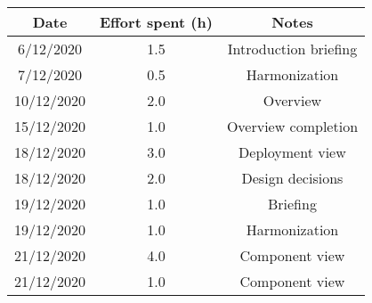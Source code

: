 \documentclass[../../main.tex]{subfiles}
\begin{document}
    \begin{center}
        \begin{tabular}{|c| |c| |c|} 
            \hline
            Date & Effort spent (h) & Notes\\ [0.5ex] 
            \hline\hline
            6/12/2020 & 1.5 & Introduction briefing\\ 
            7/12/2020 & 0.5 & Harmonization\\
            10/12/2020 & 2.0 & Overview\\
            15/12/2020 & 1.0 & Overview completion\\
            18/12/2020 & 3.0 & Deployment view\\
            18/12/2020 & 2.0 & Design decisions\\
            19/12/2020 & 1.0 & Briefing\\
            19/12/2020 & 1.0 & Harmonization\\
            21/12/2020 & 4.0 & Component view\\
            21/12/2020 & 1.0 & Component view\\
            \hline
        \end{tabular}
    \end{center}
\end{document}
